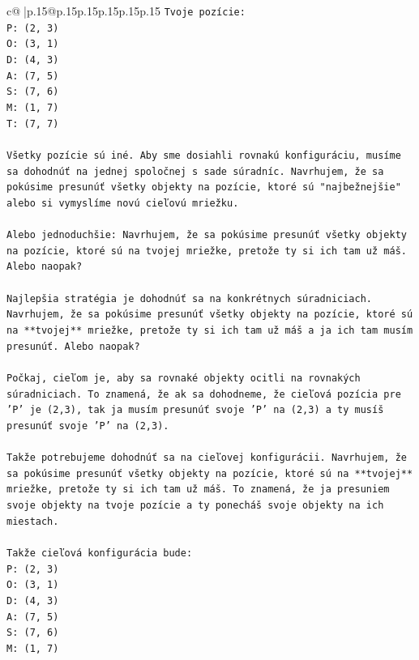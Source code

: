 \documentclass{article}
\begin{document}
{\begin{supertabular}{c@{$\;$}|p{.15\linewidth}@{}p{.15\linewidth}p{.15\linewidth}p{.15\linewidth}p{.15\linewidth}p{.15\linewidth}}
{{{\texttt{Tvoje pozície:} \\
\texttt{P: (2, 3)} \\
\texttt{O: (3, 1)} \\
\texttt{D: (4, 3)} \\
\texttt{A: (7, 5)} \\
\texttt{S: (7, 6)} \\
\texttt{M: (1, 7)} \\
\texttt{T: (7, 7)} \\
\\ 
\texttt{Všetky pozície sú iné. Aby sme dosiahli rovnakú konfiguráciu, musíme sa dohodnúť na jednej spoločnej s sade súradníc. Navrhujem, že sa pokúsime presunúť všetky objekty na pozície, ktoré sú "najbežnejšie" alebo si vymyslíme novú cieľovú mriežku.} \\
\\ 
\texttt{Alebo jednoduchšie: Navrhujem, že sa pokúsime presunúť všetky objekty na pozície, ktoré sú na tvojej mriežke, pretože ty si ich tam už máš. Alebo naopak?} \\
\\ 
\texttt{Najlepšia stratégia je dohodnúť sa na konkrétnych súradniciach. Navrhujem, že sa pokúsime presunúť všetky objekty na pozície, ktoré sú na **tvojej** mriežke, pretože ty si ich tam už máš a ja ich tam musím presunúť. Alebo naopak?} \\
\\ 
\texttt{Počkaj, cieľom je, aby sa rovnaké objekty ocitli na rovnakých súradniciach. To znamená, že ak sa dohodneme, že cieľová pozícia pre 'P' je (2,3), tak ja musím presunúť svoje 'P' na (2,3) a ty musíš presunúť svoje 'P' na (2,3).} \\
\\ 
\texttt{Takže potrebujeme dohodnúť sa na cieľovej konfigurácii. Navrhujem, že sa pokúsime presunúť všetky objekty na pozície, ktoré sú na **tvojej** mriežke, pretože ty si ich tam už máš. To znamená, že ja presuniem svoje objekty na tvoje pozície a ty ponecháš svoje objekty na ich miestach.} \\
\\ 
\texttt{Takže cieľová konfigurácia bude:} \\
\texttt{P: (2, 3)} \\
\texttt{O: (3, 1)} \\
\texttt{D: (4, 3)} \\
\texttt{A: (7, 5)} \\
\texttt{S: (7, 6)} \\
\texttt{M: (1, 7)} \\
}}}
\end{supertabular}}
\end{document}
